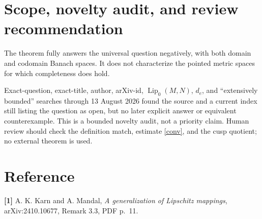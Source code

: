 \documentclass[11pt]{article}
\newcommand{\Lip}{\operatorname{Lip}}
\begin{document}
\section*{Scope, novelty audit, and review recommendation}

The theorem fully answers the universal question negatively, with both
domain and codomain Banach spaces.  It does not characterize the pointed
metric spaces for which completeness does hold.

Exact-question, exact-title, author, arXiv-id, $\Lip_0(M,N)$, $d_e$, and
``extensively bounded'' searches through 13 August 2026 found the source and
a current index still listing the question as open, but no later explicit
answer or equivalent counterexample.  This is a bounded novelty audit, not a
priority claim.  Human review should check the definition match, estimate
\eqref{conv}, and the cusp quotient; no external theorem is used.

\section*{Reference}

\textbf{[1]} A. K. Karn and A. Mandal,
\emph{A generalization of Lipschitz mappings}, arXiv:2410.10677,
Remark 3.3, PDF p.~11.
\end{document}
